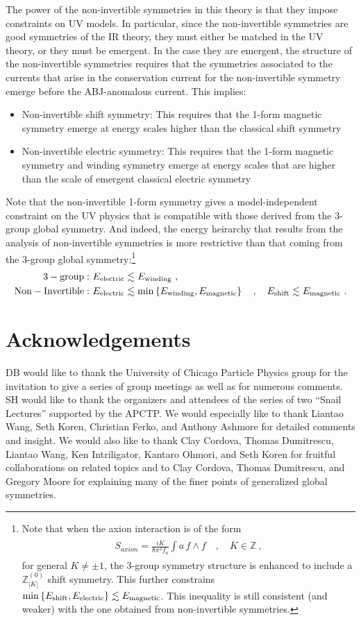 \documentclass[11pt]{article}
\newcommand{\eq}[1]{\begin{align}\begin{split}#1\end{split}\end{align}}
\def\IZ{{\mathbb{Z}}}
\begin{document}
The power of the non-invertible symmetries in this theory is that they impose constraints on UV models. In particular, since the non-invertible symmetries are good symmetries of the IR theory, they must either be matched in the UV theory, or they must be emergent. In the case they are emergent, the structure of the non-invertible symmetries requires that the symmetries associated to the currents that arise in the conservation current for the non-invertible symmetry emerge before the ABJ-anomalous current. This implies: 
\begin{itemize}
\item Non-invertible shift symmetry: This requires that the 1-form magnetic symmetry emerge at energy scales higher than the classical shift symmetry
\item Non-invertible electric symmetry: This requires that the 1-form magnetic symmetry and winding symmetry emerge at energy scales that are higher than the scale of emergent classical electric symmetry
\end{itemize}
Note that the non-invertible 1-form symmetry gives a model-independent constraint on the UV physics that is compatible with those derived from the 3-group global symmetry. And indeed, the energy heirarchy that results from the analysis of non-invertible symmetries is more restrictive than that coming from the 3-group global symmetry:\footnote{Note that when the axion interaction is of the form 
\eq{
S_{axion}=\frac{iK}{8\pi^2f_a}\int a\, f\wedge f\quad, \quad K\in \IZ~,
}
for general $K\neq \pm1$, the 3-group symmetry structure is enhanced to include a $\IZ_{|K|}^{(0)}$ shift symmetry. This further constrains ${\rm min}\left\{E_{\rm shift},E_{\rm electric}\right\}\lesssim E_{\rm magnetic}$. This inequality is still consistent (and weaker) with the one obtained from non-invertible symmetries. 
}
\eq{
{\rm 3-group:}&~E_{\rm electric}\lesssim E_{\rm winding}~,\\
{\rm Non-Invertible:}&~E_{\rm electric}\lesssim {\rm min}\left\{E_{\rm winding},E_{\rm magnetic}\right\}\quad, \quad E_{\rm shift}\lesssim E_{\rm magnetic}~.
}


\section*{Acknowledgements}

DB would like to thank the University of Chicago Particle Physics group for the invitation to give a series of group meetings as well as for numerous comments. SH would like to thank the organizers and attendees of the series of two ``Snail Lectures'' supported by the APCTP. 
 We would especially like to thank Liantao Wang, Seth Koren, Christian Ferko, and Anthony Ashmore for detailed comments and insight. We would also like to thank Clay Cordova, Thomas Dumitrescu, Liantao Wang, Ken Intriligator, Kantaro Ohmori, and Seth Koren for fruitful collaborations on related topics and to Clay Cordova, Thomas Dumitrescu, and Gregory Moore for explaining many of the finer points of generalized global symmetries. 
\end{document}
